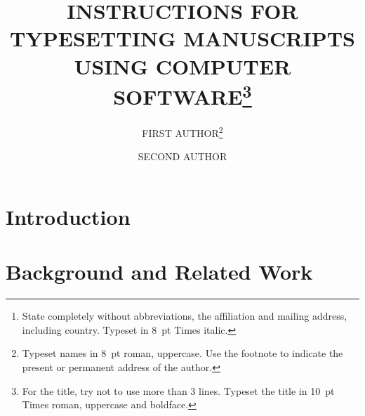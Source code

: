 \documentclass{ws-ijhr}
\begin{document}

%
\catchline{}{}{}{}{}
%

\title{INSTRUCTIONS FOR TYPESETTING MANUSCRIPTS\\
USING COMPUTER SOFTWARE\footnote{For the title, try not to 
use more than 3 lines. Typeset the title in 10~pt 
Times roman, uppercase and boldface.} }

\author{FIRST AUTHOR\footnote{Typeset names in 8~pt roman,
uppercase. Use the footnote to indicate the 
present or permanent address of the author.}}

\address{University Department, University Name, Address\\
City, State ZIP/Zone,
Country\footnote{State completely without abbreviations, the
affiliation and mailing address, including country. Typeset in 8~pt
Times italic.}\\
first\_author@university.edu}

\author{SECOND AUTHOR}

\address{Group, Laboratory, Address\\
City, State ZIP/Zone, Country\\
second\_author@group.com}

\maketitle

\begin{history}
\end{history}

\begin{abstract}

\end{abstract}


\section{Introduction}



\section{Background and Related Work}
\end{document}
